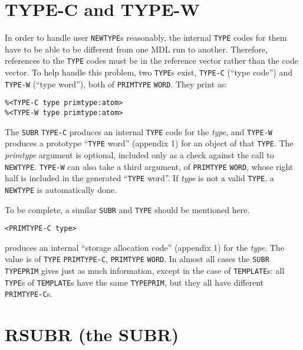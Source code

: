 \documentclass[a4paper]{scrbook}
\begin{document}
\section{TYPE-C and TYPE-W}\label{type-c-and-type-w}

In order to handle user \texttt{NEWTYPE}s reasonably, the internal \texttt{TYPE} codes for them
have to be able to be different from one MDL run to another. Therefore, references to the \texttt{TYPE} codes must be in
the reference vector rather than the code vector. To help handle this problem, two \texttt{TYPE}s exist,
\texttt{TYPE-C} (``type code'') and \texttt{TYPE-W} (``type
word''), both of \texttt{PRIMTYPE} \texttt{WORD}. They print as:

\begin{verbatim}
%<TYPE-C type primtype:atom>
%<TYPE-W type primtype:atom>
\end{verbatim}

The \texttt{SUBR} \texttt{TYPE-C} produces an internal \texttt{TYPE} code for the \emph{type}, and \texttt{TYPE-W} produces
a prototype ``\texttt{TYPE} word'' (appendix 1) for an object of that \texttt{TYPE}. The \emph{primtype} argument is
optional, included only as a check against the call to \texttt{NEWTYPE}. \texttt{TYPE-W} can also take a third argument, of
\texttt{PRIMTYPE} \texttt{WORD}, whose right half is included in the generated ``\texttt{TYPE} word''. If \emph{type} is
not a valid \texttt{TYPE}, a \texttt{NEWTYPE} is automatically done.

To be complete, a similar \texttt{SUBR} and \texttt{TYPE} should be mentioned here.

\begin{verbatim}
<PRIMTYPE-C type>
\end{verbatim}

 produces an internal ``storage allocation code'' (appendix 1) for the \emph{type}. The
value is of \texttt{TYPE} \texttt{PRIMTYPE-C}, \texttt{PRIMTYPE} \texttt{WORD}. In almost all cases the \texttt{SUBR}
\texttt{TYPEPRIM} gives just as much information, except in the case of \texttt{TEMPLATE}s: all \texttt{TYPE}s of
\texttt{TEMPLATE}s have the same \texttt{TYPEPRIM}, but they all have different \texttt{PRIMTYPE-C}s.

\section{RSUBR (the SUBR)}\label{rsubr-the-subr}
\end{document}
